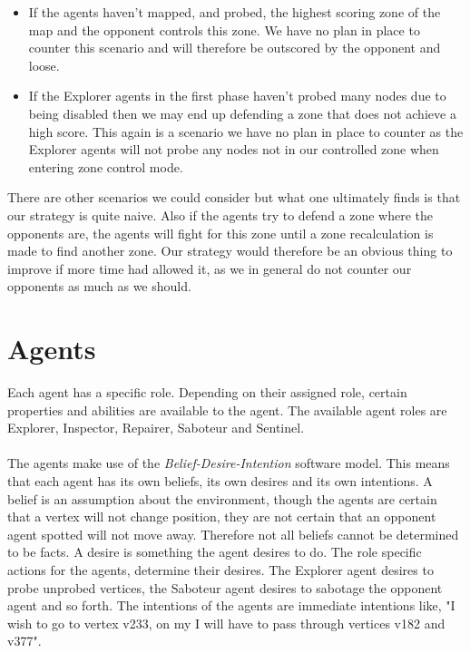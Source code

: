 \documentclass[11pt]{article}
\begin{document}
\begin{itemize}
	\item If the agents haven't mapped, and probed, the highest scoring zone of the map and the opponent controls this zone. We have no plan in place to counter this scenario and will therefore be outscored by the opponent and loose.
	
	\item If the Explorer agents in the first phase haven't probed many nodes due to being disabled then we may end up defending a zone that does not achieve a high score. This again is a scenario we have no plan in place to counter as the Explorer agents will not probe any nodes not in our controlled zone when entering zone control mode.
\end{itemize}

There are other scenarios we could consider but what one ultimately finds is that our strategy is quite naive. Also if the agents try to defend a zone where the opponents are, the agents will fight for this zone until a zone recalculation is made to find another zone. Our strategy would therefore be an obvious thing to improve if more time had allowed it, as we in general do not counter our opponents as much as we should.

\section{Agents}
Each agent has a specific role. Depending on their assigned role, certain properties and abilities are available to the agent. The available agent roles are Explorer, Inspector, Repairer, Saboteur and Sentinel.\\
\\
The agents make use of the \emph{Belief-Desire-Intention} software model. This means that each agent has its own beliefs, its own desires and its own intentions. A belief is an assumption about the environment, though the agents are certain that a vertex will not change position, they are not certain that an opponent agent spotted will not move away. Therefore not all beliefs cannot be determined to be facts.
A desire is something the agent desires to do. The role specific actions for the agents, determine their desires. The Explorer agent desires to probe unprobed vertices, the Saboteur agent desires to sabotage the opponent agent and so forth. The intentions of the agents are immediate intentions like, "I wish to go to vertex v233, on my I will have to pass through vertices v182 and v377".
\end{document}
